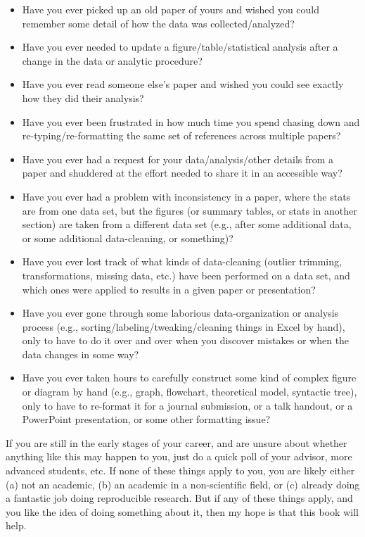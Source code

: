 \documentclass{book}
\begin{document}
\begin{itemize}
\item Have you ever picked up an old paper of yours and wished you could remember some detail of how the data was collected/analyzed?
\item Have you ever needed to update a figure/table/statistical analysis after a change in the data or analytic procedure?
\item Have you ever read someone else's paper and wished you could see exactly how they did their analysis?
\item Have you ever been frustrated in how much time you spend chasing down and re-typing/re-formatting the same set of references across multiple papers?
\item Have you ever had a request for your data/analysis/other details from a paper and shuddered at the effort needed to share it in an accessible way?
\item Have you ever had a problem with inconsistency in a paper, where the stats are from one data set, but the figures (or summary tables, or stats in another section) are taken from a different data set (e.g., after some additional data, or some additional data-cleaning, or something)?
\item Have you ever lost track of what kinds of data-cleaning (outlier trimming, transformations, missing data, etc.) have been performed on a data set, and which ones were applied to results in a given paper or presentation?
\item Have you ever gone through some laborious data-organization or analysis process (e.g., sorting/labeling/tweaking/cleaning things in Excel by hand), only to have to do it over and over when you discover mistakes or when the data changes in some way?
\item Have you ever taken hours to carefully construct some kind of complex figure or diagram by hand (e.g., graph, flowchart, theoretical model, syntactic tree), only to have to re-format it for a journal submission, or a talk handout, or a PowerPoint presentation, or some other formatting issue?
\end{itemize}

If you are still in the early stages of your career, and are unsure about whether anything like this may happen to you, just do a quick poll of your advisor, more advanced students, etc. If none of these things apply to you, you are likely either (a) not an academic, (b) an academic in a non-scientific field, or (c) already doing a fantastic job doing reproducible research.  But if any of these things apply, and you like the idea of doing something about it, then my hope is that this book will help.
\end{document}

